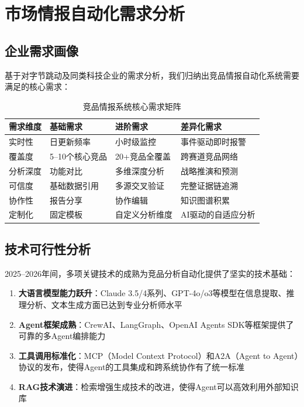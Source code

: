 \documentclass[12pt,a4paper]{ctexrep}
\begin{document}
\section{市场情报自动化需求分析}

\subsection{企业需求画像}

基于对字节跳动及同类科技企业的需求分析，我们归纳出竞品情报自动化系统需要满足的核心需求：

\begin{table}[H]
\centering
\caption{竞品情报系统核心需求矩阵}
\label{tab:requirements}
{\small
\begin{tabular}{p{2.5cm} p{3.5cm} p{3.5cm} p{3.5cm}}
\toprule
\textbf{需求维度} & \textbf{基础需求} & \textbf{进阶需求} & \textbf{差异化需求} \\
\midrule
实时性 & 日更新频率 & 小时级监控 & 事件驱动即时报警 \\
\addlinespace
覆盖度 & 5--10个核心竞品 & 20+竞品全覆盖 & 跨赛道竞品网络 \\
\addlinespace
分析深度 & 功能对比 & 多维深度分析 & 战略推演和预测 \\
\addlinespace
可信度 & 基础数据引用 & 多源交叉验证 & 完整证据链追溯 \\
\addlinespace
协作性 & 报告分享 & 协作编辑 & 知识图谱积累 \\
\addlinespace
定制化 & 固定模板 & 自定义分析维度 & AI驱动的自适应分析 \\
\bottomrule
\end{tabular}
}
\end{table}

\subsection{技术可行性分析}

2025--2026年间，多项关键技术的成熟为竞品分析自动化提供了坚实的技术基础：

\begin{enumerate}[leftmargin=2em]
\item \textbf{大语言模型能力跃升}：Claude 3.5/4系列、GPT-4o/o3等模型在信息提取、推理分析、文本生成方面已达到专业分析师水平\cite{transformer2017,chainofthought2022}
\item \textbf{Agent框架成熟}：CrewAI、LangGraph、OpenAI Agents SDK等框架提供了可靠的多Agent编排能力\cite{crewai2024,langgraph2024,openaiagentssdk2025}
\item \textbf{工具调用标准化}：MCP（Model Context Protocol）和A2A（Agent to Agent）协议的发布，使得Agent的工具集成和跨系统协作有了统一标准\cite{mcp2025,a2a2025}
\item \textbf{RAG技术演进}：检索增强生成技术的改进，使得Agent可以高效利用外部知识库\cite{rag2020}
\end{enumerate}
\end{document}
